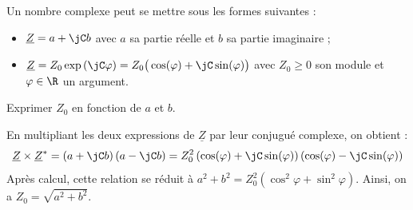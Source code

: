 


\hauteurLargeurCadreReponse		{6mm}{5cm}
\initialisationEntrainement

Un nombre complexe peut se mettre sous les formes suivantes : 
\begin{itemize}
	\item $\underline{Z}=a+\jC b$ 	avec $a$ sa partie réelle et $b$ sa partie imaginaire ; 
	\item $\underline{Z}=Z_0 \exp{\left(\jC \varphi \right)} = Z_0 \big(\cos(\varphi) + \jC \sin (\varphi)  \big) $ avec $Z_0\geq 0$ son module et $\varphi\in \R$ un argument. 
\end{itemize}
\debutEntrainement


\begin{enonce}
Exprimer $Z_0$ en fonction de $a$ et $b$.
\end{enonce}


\begin{corrige}
	En multipliant les deux expressions de $\underline{Z}$ par leur conjugué complexe, on obtient :
	\[
	\underline{Z}\times\underline{Z}^{*} = \left(a + \jC b \right)\left(a - \jC b \right)  = Z_0^2 \left(\cos (\varphi) + \jC \sin (\varphi) \right)\left(\cos (\varphi) - \jC \sin (\varphi) \right) 
	\]
Après calcul, cette relation se réduit à 
$a^2 + b^2  = Z_0^2 \left(\cos^2 \varphi + \sin^2 \varphi \right)$. Ainsi, on a
	 $Z_0 = \sqrt{a^2 + b^2}$.
\end{corrige}

